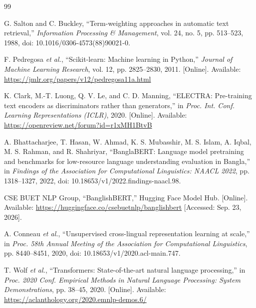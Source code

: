 \documentclass[12pt,a4paper]{report}
\begin{document}
\begin{thebibliography}{99}
\small

G. Salton and C. Buckley,
``Term-weighting approaches in automatic text retrieval,''
\textit{Information Processing \& Management},
vol. 24, no. 5, pp. 513--523, 1988,
doi: 10.1016/0306-4573(88)90021-0.

F. Pedregosa \textit{et al.},
``Scikit-learn: Machine learning in Python,''
\textit{Journal of Machine Learning Research},
vol. 12, pp. 2825--2830, 2011.
[Online]. Available:
\url{https://jmlr.org/papers/v12/pedregosa11a.html}

K. Clark, M.-T. Luong, Q. V. Le, and C. D. Manning,
``ELECTRA: Pre-training text encoders as discriminators rather than
generators,''
in \textit{Proc. Int. Conf. Learning Representations (ICLR)}, 2020.
[Online]. Available:
\url{https://openreview.net/forum?id=r1xMH1BtvB}

A. Bhattacharjee, T. Hasan, W. Ahmad, K. S. Mubasshir, M. S. Islam,
A. Iqbal, M. S. Rahman, and R. Shahriyar,
``BanglaBERT: Language model pretraining and benchmarks for low-resource
language understanding evaluation in Bangla,''
in \textit{Findings of the Association for Computational Linguistics:
NAACL 2022}, pp. 1318--1327, 2022,
doi: 10.18653/v1/2022.findings-naacl.98.

CSE BUET NLP Group,
``BanglishBERT,'' Hugging Face Model Hub.
[Online]. Available:
\url{https://huggingface.co/csebuetnlp/banglishbert}
[Accessed: Sep. 23, 2026].

A. Conneau \textit{et al.},
``Unsupervised cross-lingual representation learning at scale,''
in \textit{Proc. 58th Annual Meeting of the Association for Computational
Linguistics}, pp. 8440--8451, 2020,
doi: 10.18653/v1/2020.acl-main.747.

T. Wolf \textit{et al.},
``Transformers: State-of-the-art natural language processing,''
in \textit{Proc. 2020 Conf. Empirical Methods in Natural Language
Processing: System Demonstrations}, pp. 38--45, 2020.
[Online]. Available:
\url{https://aclanthology.org/2020.emnlp-demos.6/}

\end{thebibliography}
\end{document}
